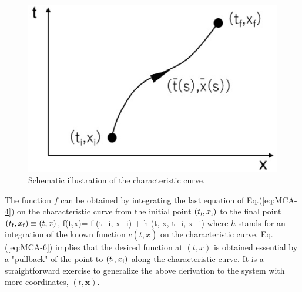 \begin{figure}[t]
\begin{center}
\includegraphics[scale=0.35]{Chapter3-figures/char-c.eps} 
 \end{center}
\caption{Schematic illustration of the characteristic curve.}
\label{fig:char-c}
\end{figure}

The function $f$ can be obtained by integrating the last equation of Eq.(\ref{eq:MCA-4}) 
on the  characteristic curve from the initial point $(t_{\rm i},x_{\rm i})$ to the final point $(t_{\rm f},x_{\rm f})\equiv (t,x)$,
\beq
f(t,x)= f (t_{\rm i}, x_{\rm i}) + h (t, x, t_{\rm i}, x_{\rm i})
\label{eq:MCA-6}
\eeq
where  $h$ stands for an integration of the known function $c(\bar{t},\bar{x})$ on the
characteristic curve.  Eq.(\ref{eq:MCA-6}) implies  that the desired function at $(t,x)$ is obtained 
essential by a "pullback" of the point to $(t_{\rm i},x_{\rm i})$ along the characteristic curve. 
It is a straightforward exercise  to generalize the above derivation to the system with more coordinates,
$(t, \mathbf{x})$.  

 \subsubsection*{}

